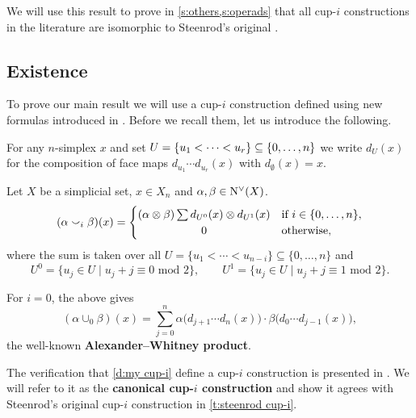 We will use this result to prove in \cref{s:others,s:operads} that all \mbox{cup-$i$} constructions in the literature are isomorphic to Steenrod's original \cite{steenrod1947products}.

\subsection{Existence}

To prove our main result we will use a \mbox{cup-$i$} construction defined using new formulas introduced in \cite{medina2023fast_sq}.
Before we recall them, let us introduce the following.

\begin{notation*}
	For any $n$-simplex $x$ and set $U = \{u_1 < \dots < u_r\} \subseteq \set[big]{0,\dots,n}$ we write $d_U(x)$ for the composition of face maps $d_{u_1}\! \dotsm d_{u_r}(x)$ with $d_{\emptyset}(x) = x$.
\end{notation*}

\begin{definition}\label{d:my cup-i}
	Let $X$ be a simplicial set, $x \in X_n$ and $\alpha, \beta \in \operatorname{N^{\vee}}(X)$.
	\[
	(\alpha \cup_i \beta)(x) =
	\begin{cases}
		(\alpha \ot \beta) \sum d_{U^0}(x) \ot d_{U^1}(x) &
		\text{if } i \in \{0, \dots, n\}, \\
		\hfil 0 &
		\text{otherwise},
	\end{cases}
	\]
	where the sum is taken over all $U = \{u_1 < \cdots < u_{n-i}\} \subseteq \{0, \dots, n\}$ and
	\[
	U^0 = \{u_j \in U \mid u_j + j \equiv 0 \text{ mod } 2\}, \qquad
	U^1 = \{u_j \in U \mid u_j + j \equiv 1 \text{ mod } 2\}.
	\]
\end{definition}

\begin{example}
	For $i = 0$, the above gives
	\begin{equation*}
	(\alpha \cup_0 \beta)(x) =
	\sum_{j=0}^n \alpha \big(d_{j+1} \cdots d_{n}(x)\big) \cdot \beta \big(d_{0} \cdots d_{j-1}(x)\big),
	\end{equation*}
	the well-known \textbf{Alexander--Whitney product}.
\end{example}

The verification that \cref{d:my cup-i} define a \mbox{cup-$i$} construction is presented in \cite{medina2023fast_sq}.
We will refer to it as the \textbf{canonical \mbox{cup-$i$} construction} and show it agrees with Steenrod's original cup-$i$ construction  in \cref{t:steenrod cup-i}.